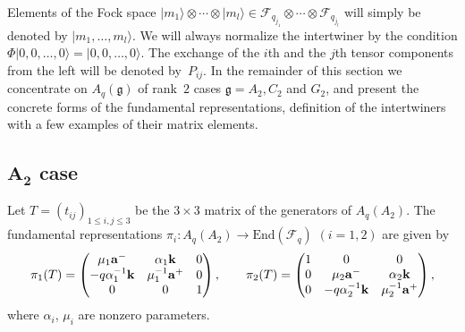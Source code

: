 \documentclass[11pt]{article}
\begin{document}
Elements of the Fock space
$|m_1\rangle \otimes \cdots \otimes |m_l\rangle
\in \mathcal{F}_{q_{j_1}}\otimes \cdots \otimes \mathcal{F}_{q_{j_l}}$
will simply be denoted by
$|m_1, \ldots, m_l\rangle$.
We will always normalize the intertwiner by the condition
$\Phi |0,0,\ldots, 0\rangle =  |0,0,\ldots, 0\rangle$.
The exchange of the $i$th and the $j$th tensor components from the left
will be denoted by~$P_{ij}$.
In the remainder of this section we concentrate on
$A_q(\mathfrak{g})$ of rank~$2$ cases
$\mathfrak{g}=A_2, C_2$ and $G_2$,
and present the concrete forms of the
fundamental representations,
def\/inition of the intertwiners with
a few examples of their matrix elements.

\subsection[$A_2$ case]{$\boldsymbol{A_2}$ case}\label{a:ss:a2}

Let $T=(t_{ij})_{1\le i,j \le 3}$ be the
$3\times 3$ matrix of the generators of $A_q(A_2)$.
The fundamental representations
$\pi_i: A_q(A_2) \rightarrow \mathrm{End}(\mathcal{F}_q)$
$(i=1,2)$ are given by
\begin{gather}\label{a:piTa}
\pi_1(T) =
\begin{pmatrix}
\mu_1{\rm {\bf a}}^- &  \alpha_1{\rm {\bf k}} & 0 \\
-q\alpha^{-1}_1{\rm {\bf k}} & \mu^{-1}_1{\rm {\bf a}}^+ & 0\\
0 & 0 & 1
\end{pmatrix},
\qquad
\pi_2(T) =
\begin{pmatrix}
1 & 0 & 0\\
0 & \mu_2{\rm {\bf a}}^- &  \alpha_2{\rm {\bf k}}\\
0 & -q\alpha^{-1}_2{\rm {\bf k}} & \mu^{-1}_2{\rm {\bf a}}^+
\end{pmatrix},
\end{gather}
where $\alpha_i$, $\mu_i$ are nonzero parameters.
\end{document}
